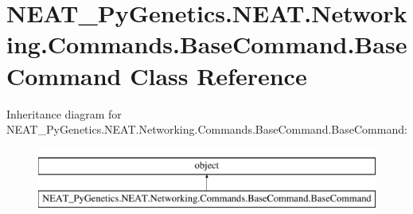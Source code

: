 \hypertarget{class_n_e_a_t___py_genetics_1_1_n_e_a_t_1_1_networking_1_1_commands_1_1_base_command_1_1_base_command}{}\section{N\+E\+A\+T\+\_\+\+Py\+Genetics.\+N\+E\+A\+T.\+Networking.\+Commands.\+Base\+Command.\+Base\+Command Class Reference}
\label{class_n_e_a_t___py_genetics_1_1_n_e_a_t_1_1_networking_1_1_commands_1_1_base_command_1_1_base_command}
Inheritance diagram for N\+E\+A\+T\+\_\+\+Py\+Genetics.\+N\+E\+A\+T.\+Networking.\+Commands.\+Base\+Command.\+Base\+Command\+:\begin{figure}[H]
\begin{center}
\leavevmode
\includegraphics[height=2.000000cm]{class_n_e_a_t___py_genetics_1_1_n_e_a_t_1_1_networking_1_1_commands_1_1_base_command_1_1_base_command}
\end{center}
\end{figure}
